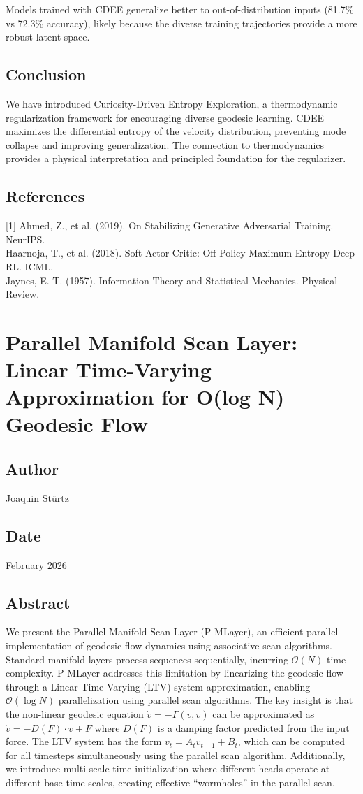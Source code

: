 Models trained with CDEE generalize better to out-of-distribution inputs (81.7\% vs 72.3\% accuracy), likely because the diverse training trajectories provide a more robust latent space.

\subsection{Conclusion}
We have introduced Curiosity-Driven Entropy Exploration, a thermodynamic regularization framework for encouraging diverse geodesic learning. CDEE maximizes the differential entropy of the velocity distribution, preventing mode collapse and improving generalization. The connection to thermodynamics provides a physical interpretation and principled foundation for the regularizer.

\subsection*{References}
[1] Ahmed, Z., et al. (2019). On Stabilizing Generative Adversarial Training. NeurIPS.\\
[2] Haarnoja, T., et al. (2018). Soft Actor-Critic: Off-Policy Maximum Entropy Deep RL. ICML.\\
[3] Jaynes, E. T. (1957). Information Theory and Statistical Mechanics. Physical Review.

\section{Parallel Manifold Scan Layer: Linear Time-Varying Approximation for O(log N) Geodesic Flow}
\subsection*{Author}
Joaquin Stürtz
\subsection*{Date}
February 2026
\subsection*{Abstract}
We present the Parallel Manifold Scan Layer (P-MLayer), an efficient parallel implementation of geodesic flow dynamics using associative scan algorithms. Standard manifold layers process sequences sequentially, incurring $\mathcal{O}(N)$ time complexity. P-MLayer addresses this limitation by linearizing the geodesic flow through a Linear Time-Varying (LTV) system approximation, enabling $\mathcal{O}(\log N)$ parallelization using parallel scan algorithms. The key insight is that the non-linear geodesic equation $\dot{v} = -\Gamma(v, v)$ can be approximated as $\dot{v} = -D(F) \cdot v + F$ where $D(F)$ is a damping factor predicted from the input force. The LTV system has the form $v_t = A_t v_{t-1} + B_t$, which can be computed for all timesteps simultaneously using the parallel scan algorithm. Additionally, we introduce multi-scale time initialization where different heads operate at different base time scales, creating effective ``wormholes'' in the parallel scan.

